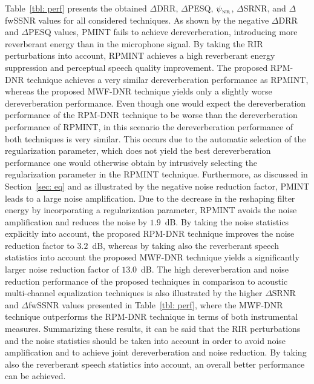 \documentclass[10pt]{IEEEtran}
\begin{document}
Table~\ref{tbl: perf} presents the obtained $\Delta$DRR, $\Delta$PESQ, $\psi_{_{\rm NR}}$, $\Delta$SRNR, and $\Delta$fwSSNR values for all considered techniques.
As shown by the negative $\Delta$DRR and $\Delta$PESQ values, PMINT fails to achieve dereverberation, introducing more reverberant energy than in the microphone signal.
By taking the RIR perturbations into account, RPMINT achieves a high reverberant energy suppression and perceptual speech quality improvement.
The proposed RPM-DNR technique achieves a very similar dereverberation performance as RPMINT, whereas the proposed MWF-DNR technique yields only a slightly worse dereverberation performance. 
Even though one would expect the dereverberation performance of the RPM-DNR technique to be worse than the dereverberation performance of RPMINT, in this scenario the dereverberation performance of both techniques is very similar. 
This occurs due to the automatic selection of the regularization parameter, which does not yield the best dereverberation performance one would otherwise obtain by intrusively selecting the regularization parameter in the RPMINT technique.
Furthermore, as discussed in Section~\ref{sec: eq} and as illustrated by the negative noise reduction factor, PMINT leads to a large noise amplification.
Due to the decrease in the reshaping filter energy by incorporating a regularization parameter, RPMINT avoids the noise amplification and reduces the noise by $1.9$~dB.
By taking the noise statistics explicitly into account, the proposed RPM-DNR technique improves the noise reduction factor to $3.2$~dB, whereas by taking also the reverberant speech statistics into account the proposed MWF-DNR technique yields a significantly larger noise reduction factor of $13.0$~dB. 
The high dereverberation and noise reduction performance of the proposed techniques in comparison to acoustic multi-channel equalization techniques is also illustrated by the higher $\Delta$SRNR and $\Delta$fwSSNR values presented in Table~\ref{tbl: perf}, where the MWF-DNR technique outperforms the RPM-DNR technique in terms of both instrumental measures. 
Summarizing these results, it can be said that the RIR perturbations and the noise statistics should be taken into account in order to avoid noise amplification and to achieve joint dereverberation and noise reduction.
By taking also the reverberant speech statistics into account, an overall better performance can be achieved.
\end{document}
